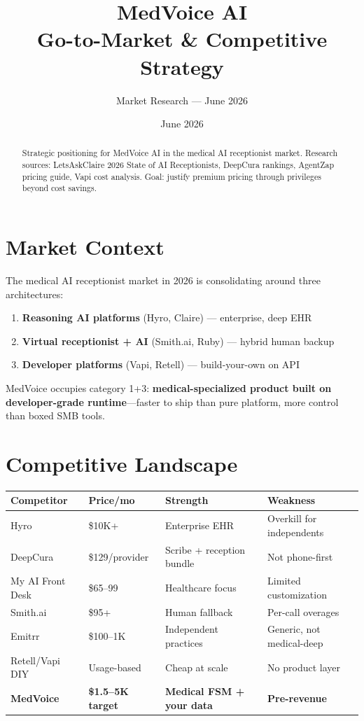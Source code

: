 \documentclass[11pt,a4paper]{article}
\title{MedVoice AI\\Go-to-Market \& Competitive Strategy}
\author{Market Research --- June 2026}
\date{June 2026}
\begin{document}
\maketitle

\begin{abstract}
Strategic positioning for MedVoice AI in the medical AI receptionist market. Research sources: LetsAskClaire 2026 State of AI Receptionists, DeepCura rankings, AgentZap pricing guide, Vapi cost analysis. Goal: justify premium pricing through privileges beyond cost savings.
\end{abstract}

\section{Market Context}

The medical AI receptionist market in 2026 is consolidating around three architectures:
\begin{enumerate}[nosep]
  \item \textbf{Reasoning AI platforms} (Hyro, Claire) --- enterprise, deep EHR
  \item \textbf{Virtual receptionist + AI} (Smith.ai, Ruby) --- hybrid human backup
  \item \textbf{Developer platforms} (Vapi, Retell) --- build-your-own on API
\end{enumerate}

MedVoice occupies category 1+3: \textbf{medical-specialized product built on developer-grade runtime}---faster to ship than pure platform, more control than boxed SMB tools.

\section{Competitive Landscape}

\begin{center}
\scriptsize
\begin{tabular}{@{}llll@{}}
\toprule
\textbf{Competitor} & \textbf{Price/mo} & \textbf{Strength} & \textbf{Weakness} \\
\midrule
Hyro & \$10K+ & Enterprise EHR & Overkill for independents \\
DeepCura & \$129/provider & Scribe + reception bundle & Not phone-first \\
My AI Front Desk & \$65--99 & Healthcare focus & Limited customization \\
Smith.ai & \$95+ & Human fallback & Per-call overages \\
Emitrr & \$100--1K & Independent practices & Generic, not medical-deep \\
Retell/Vapi DIY & Usage-based & Cheap at scale & No product layer \\
\textbf{MedVoice} & \textbf{\$1.5--5K target} & \textbf{Medical FSM + your data} & \textbf{Pre-revenue} \\
\bottomrule
\end{tabular}
\end{center}
\end{document}
